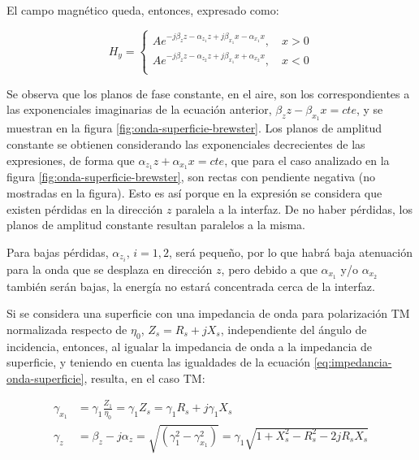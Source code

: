 El campo magnético queda, entonces, expresado como:

\begin{equation}
	H_y =
	\left\lbrace
	\begin{aligned}
		A e^{-j\beta_z z -\alpha_{z_1} z + j\beta_{x_1}x - \alpha_{x_1}x}, \quad x>0 \\
		A e^{-j\beta_z z -\alpha_{z_2} z + j\beta_{x_1}x + \alpha_{x_2}x}, \quad x<0 \\
	\end{aligned}
	\right.
\end{equation}

Se observa que los planos de fase constante, en el aire, son los correspondientes a las exponenciales imaginarias de la ecuación anterior, $\beta_z z - \beta_{x_1}x = cte$, y se muestran en la figura \ref{fig:onda-superficie-brewster}. Los planos de amplitud constante se obtienen considerando las exponenciales decrecientes de las expresiones, de forma que $\alpha_{z_1}z + \alpha_{x_1}x = cte$, que para el caso analizado en la figura \ref{fig:onda-superficie-brewster}, son rectas con pendiente negativa (no mostradas en la figura). Esto es así porque en la expresión se considera que existen pérdidas en la dirección $z$ paralela a la interfaz. De no haber pérdidas, los planos de amplitud constante resultan paralelos a la misma.

Para bajas pérdidas, $\alpha_{z_i}$, $i=1,2$, será pequeño, por lo que habrá baja atenuación para la onda que se desplaza en dirección $z$, pero debido a que $\alpha_{x_1}$ y/o $\alpha_{x_2}$ también serán bajas, la energía no estará concentrada cerca de la interfaz.



Si se considera una superficie con una impedancia de onda para polarización TM normalizada respecto de $\eta_0$, $Z_s = R_s + j X_s$, independiente del ángulo de incidencia, entonces, al igualar la impedancia de onda a la impedancia de superficie, y teniendo en cuenta las igualdades de la ecuación \ref{eq:impedancia-onda-superficie}, resulta, en el caso TM:

\begin{align}
	\gamma_{x_1} & = \gamma_1 \frac{Z_1}{\eta_0} = \gamma_1 Z_s = \gamma_1 R_s + j \gamma_1 X_s \label{eq:h1-onda-superficie}\\
	\gamma_z &= \beta_z - j\alpha_z =\sqrt{(\gamma_1^2 - \gamma_{x_1}^2)} = \gamma_1 \sqrt{1+X_s^2 - R_s^2 - 2jR_s X_s} \label{eq:beta-onda-superficie}
\end{align}

